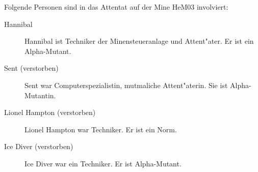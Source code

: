 
Folgende Personen sind in das Attentat auf der Mine HeM03 involviert:

\begin{description}
    \item[Hannibal] Hannibal ist Techniker der Minensteueranlage und Attent"ater. Er ist ein Alpha-Mutant.
    \item[Sent (verstorben)] Sent war Computerspezialistin, mutma\3liche Attent"aterin. Sie ist Alpha-Mutantin. 
    \item[Lionel Hampton (verstorben)] Lionel Hampton war Techniker. Er ist ein Norm. 
    \item[Ice Diver (verstorben)] Ice Diver war ein Techniker. Er ist Alpha-Mutant. 
\end{description}
